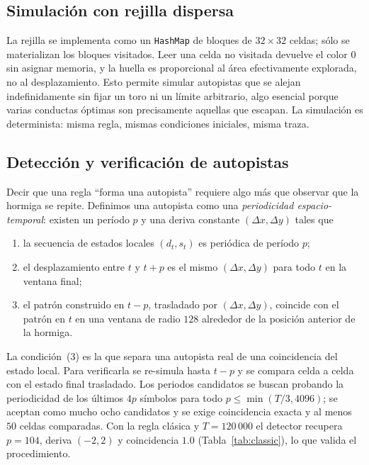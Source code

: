 \documentclass[11pt,a4paper]{article}
\begin{document}
\subsection{Simulaci\'on con rejilla dispersa}

La rejilla se implementa como un \texttt{HashMap} de bloques de $32\times32$
celdas; s\'olo se materializan los bloques visitados.  Leer una celda no
visitada devuelve el color $0$ sin asignar memoria, y la huella es proporcional
al \'area efectivamente explorada, no al desplazamiento.  Esto permite simular
autopistas que se alejan indefinidamente sin fijar un toro ni un l\'imite
arbitrario, algo esencial porque varias conductas \'optimas son precisamente
aquellas que escapan.  La simulaci\'on es determinista: misma regla, mismas
condiciones iniciales, misma traza.

\subsection{Detecci\'on y verificaci\'on de autopistas}

Decir que una regla ``forma una autopista'' requiere algo m\'as que observar que
la hormiga se repite.  Definimos una autopista como una \emph{periodicidad
espacio-temporal}: existen un per\'iodo $p$ y una deriva constante
$(\Delta x,\Delta y)$ tales que
\begin{enumerate}
  \item la secuencia de estados locales $(d_t,s_t)$ es peri\'odica de per\'iodo
        $p$;
  \item el desplazamiento entre $t$ y $t+p$ es el mismo $(\Delta x,\Delta y)$
        para todo $t$ en la ventana final;
  \item el patr\'on construido en $t-p$, trasladado por $(\Delta x,\Delta y)$,
        coincide con el patr\'on en $t$ en una ventana de radio $128$ alrededor
        de la posici\'on anterior de la hormiga.
\end{enumerate}
La condici\'on~(3) es la que separa una autopista real de una coincidencia del
estado local.  Para verificarla se re-simula hasta $t-p$ y se compara celda a
celda con el estado final trasladado.  Los periodos candidatos se buscan
probando la periodicidad de los \'ultimos $4p$ s\'imbolos para todo
$p\le\min(T/3,4096)$; se aceptan como mucho ocho candidatos y se exige
coincidencia exacta y al menos $50$ celdas comparadas.  Con la regla cl\'asica y
$T=120\,000$ el detector recupera $p=104$, deriva $(-2,2)$ y coincidencia
$1.0$ (Tabla~\ref{tab:classic}), lo que valida el procedimiento.
\end{document}
